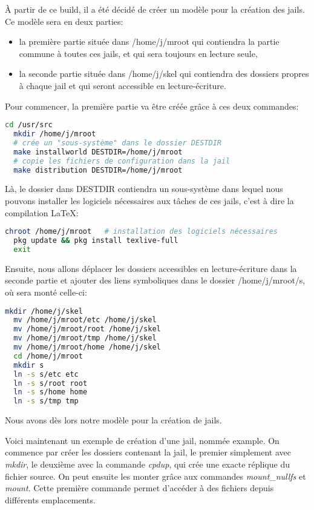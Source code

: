 \documentclass[10pt,a4paper]{article}
\begin{document}
À partir de ce build, il a été décidé de créer un modèle pour la création des jails.
Ce modèle sera en deux parties:
\begin{itemize}
  \item la première partie située dans /home/j/mroot qui contiendra la partie commune à toutes ces jails, et qui sera toujours en lecture seule,
  \item la seconde partie située dans /home/j/skel qui contiendra des dossiers propres à chaque jail et qui seront accessible en lecture-écriture.
\end{itemize}
Pour commencer, la première partie va être créée grâce à ces deux commandes:
\begin{lstlisting}[language=bash]
  cd /usr/src
  mkdir /home/j/mroot
  # crée un "sous-système" dans le dossier DESTDIR
  make installworld DESTDIR=/home/j/mroot
  # copie les fichiers de configuration dans la jail
  make distribution DESTDIR=/home/j/mroot
\end{lstlisting}
Là, le dossier dans DESTDIR contiendra un sous-système dans lequel nous pouvons installer les logiciels nécessaires aux tâches de ces jails, c'est à dire la compilation \LaTeX:
\begin{lstlisting}[language=bash]
  chroot /home/j/mroot   # installation des logiciels nécessaires
  pkg update && pkg install texlive-full
  exit
\end{lstlisting}
Ensuite, nous allons déplacer les dossiers accessibles en lecture-écriture dans la seconde partie et ajouter des liens symboliques dans le dossier /home/j/mroot/s, où sera monté celle-ci:
\begin{lstlisting}[language=bash]
  mkdir /home/j/skel
  mv /home/j/mroot/etc /home/j/skel
  mv /home/j/mroot/root /home/j/skel
  mv /home/j/mroot/tmp /home/j/skel
  mv /home/j/mroot/home /home/j/skel
  cd /home/j/mroot
  mkdir s
  ln -s s/etc etc
  ln -s s/root root
  ln -s s/home home
  ln -s s/tmp tmp
\end{lstlisting}
Nous avons dès lors notre modèle pour la création de jails.

Voici maintenant un exemple de création d'une jail, nommée example.
On commence par créer les dossiers contenant la jail, le premier simplement avec \emph{mkdir},
le deuxième avec la commande \emph{cpdup}, qui crée une exacte réplique du fichier source.
On peut ensuite les monter grâce aux commandes \emph{mount\_nullfs} et \emph{mount}.
Cette première commande permet d'accéder à des fichiers depuis différents emplacements.
\end{document}

